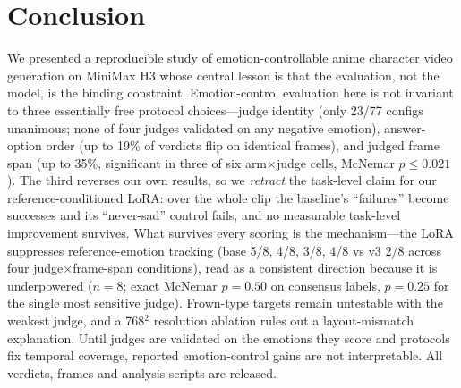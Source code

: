 \documentclass[10pt,twocolumn]{article}
\begin{document}
\section{Conclusion}
We presented a reproducible study of emotion-controllable anime character video generation on MiniMax
H3 whose central lesson is that the evaluation, not the model, is the binding constraint.
Emotion-control evaluation here is not invariant to three essentially free protocol
choices---judge identity (only 23/77 configs unanimous; none of four judges validated on any negative
emotion), answer-option order (up to 19\% of verdicts flip on identical frames), and judged frame span
(up to 35\%, significant in three of six arm$\times$judge cells, McNemar $p{\le}0.021$). The third reverses our own results,
so we \emph{retract} the task-level claim for our reference-conditioned LoRA: over the whole clip the
baseline's ``failures'' become successes and its ``never-sad'' control fails, and no measurable
task-level improvement survives. What survives every scoring is the mechanism---the LoRA suppresses
reference-emotion tracking (base 5/8, 4/8, 3/8, 4/8 vs v3 2/8 across four judge$\times$frame-span
conditions), read as a consistent direction because it is underpowered ($n{=}8$; exact McNemar
$p{=}0.50$ on consensus labels, $p{=}0.25$ for the single most sensitive judge).
Frown-type targets remain untestable with the weakest judge, and a 768$^2$ resolution ablation rules
out a layout-mismatch explanation. Until judges are validated on the emotions they score and protocols
fix temporal coverage, reported emotion-control gains are not interpretable. All verdicts, frames and
analysis scripts are released.
\end{document}
